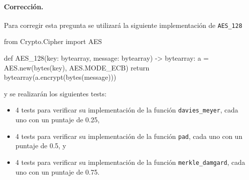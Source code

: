 \medskip

\paragraph{Corrección.}
Para corregir esta pregunta se utilizará la siguiente implementación de \verb+AES_128+
\begin{python}
from Crypto.Cipher import AES

def AES_128(key: bytearray, message: bytearray) -> bytearray:
    a = AES.new(bytes(key), AES.MODE_ECB)
    return bytearray(a.encrypt(bytes(message)))
\end{python}
y se realizarán los siguientes tests:
\begin{itemize}
\item 4 tests para verificar su implementación de la función \verb+davies_meyer+, cada uno con un puntaje de 0.25,

\item 4 tests para verificar su implementación de la función \verb+pad+, cada uno con un puntaje de 0.5, y

\item 4 tests para verificar su implementación de la función \verb+merkle_damgard+, cada uno con un puntaje de 0.75.
\end{itemize}

\medskip
